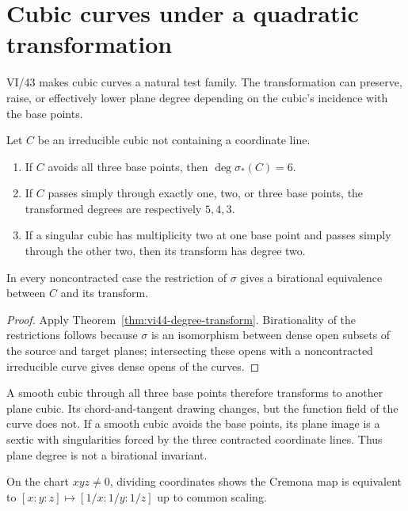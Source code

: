 \section{Cubic curves under a quadratic transformation}

VI/43 makes cubic curves a natural test family.  The transformation can preserve, raise, or effectively lower plane degree depending on the cubic's incidence with the base points.

\begin{proposition}\label{prop:vi44-cubic-transform}
Let \(C\) be an irreducible cubic not containing a coordinate line.
\begin{enumerate}[label=(\alph*)]
\item If \(C\) avoids all three base points, then \(\deg\sigma_*(C)=6\).
\item If \(C\) passes simply through exactly one, two, or three base points, the transformed degrees are respectively \(5,4,3\).
\item If a singular cubic has multiplicity two at one base point and passes simply through the other two, then its transform has degree two.
\end{enumerate}
In every noncontracted case the restriction of \(\sigma\) gives a birational equivalence between \(C\) and its transform.
\end{proposition}

\begin{proof}
Apply Theorem~\ref{thm:vi44-degree-transform}.  Birationality of the restrictions follows because \(\sigma\) is an isomorphism between dense open subsets of the source and target planes; intersecting these opens with a noncontracted irreducible curve gives dense opens of the curves.
\end{proof}

A smooth cubic through all three base points therefore transforms to another plane cubic.  Its chord-and-tangent drawing changes, but the function field of the curve does not.  If a smooth cubic avoids the base points, its plane image is a sextic with singularities forced by the three contracted coordinate lines.  Thus plane degree is not a birational invariant.



\begin{example}\label{ex:vi44-expand-03}
On the chart $xyz\ne0$, dividing coordinates shows the Cremona map is equivalent to $[x:y:z]\mapsto[1/x:1/y:1/z]$ up to common scaling.
\end{example}
